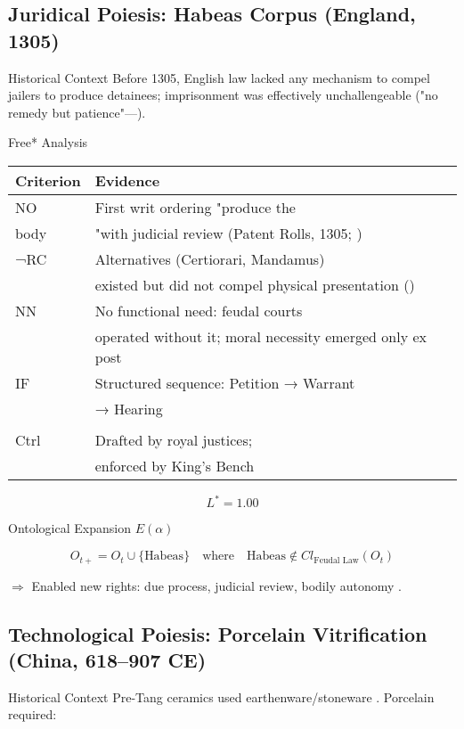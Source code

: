 \documentclass[11pt,a4paper]{article}
\begin{document}
\subsection{Juridical Poiesis: Habeas Corpus (England, 1305)}\label{sec:case-habeas}

Historical Context Before 1305, English law lacked any mechanism to compel jailers to produce detainees; imprisonment was effectively unchallengeable ("no remedy but patience"—\cite[ p. 148]{tierney2023}).

Free* Analysis

\begin{tabular}{l l}
Criterion & Evidence \\
\hline
NO & First writ ordering "produce the \\ body & "with judicial review (Patent Rolls, 1305; \cite{tierney2023}) \\
¬RC & Alternatives (Certiorari, Mandamus) \\ & existed but did not compel physical presentation (\cite{epstein2021}) \\
NN & No functional need: feudal courts \\ 
& operated without it; moral necessity emerged only ex post \\
IF & Structured sequence: Petition → Warrant \\ & → Hearing \\ & \cite[ p. 88]{carbonell2022} \\
Ctrl & Drafted by royal justices; 
\\ & enforced by King's Bench \cite[ p. 160]{tierney2023} \\
\end{tabular}

\[
L^* = 1.00
\]

Ontological Expansion \( E(\alpha) \)

\[
O_{t+} = O_t \cup \{ \text{Habeas} \} \quad \text{where} \quad \text{Habeas} \notin Cl_{\text{Feudal Law}}(O_t)
\]

\(\Rightarrow\) Enabled new rights: due process, judicial review, bodily autonomy \cite{torres2022}.

\subsection{Technological Poiesis: Porcelain Vitrification (China, 618–907 CE)}\label{sec:case-porcelain}

Historical Context Pre-Tang ceramics used earthenware/stoneware \cite{kerr2024}. Porcelain required:
\end{document}

